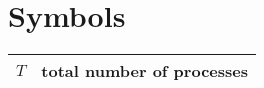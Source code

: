\section*{Symbols}


\begin{tabular}{ |c|c| } 
 \hline
 $T$ & total number of processes\\
 
 \hline
\end{tabular}